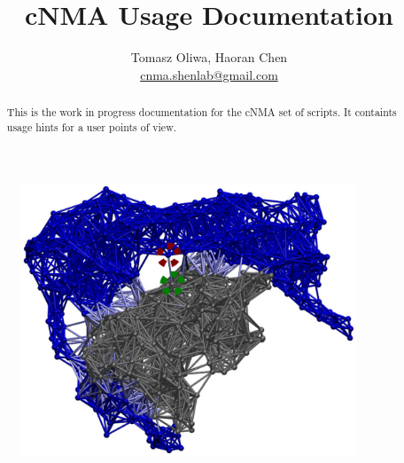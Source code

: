 \documentclass[11pt]{article}
\title{cNMA Usage Documentation}
\begin{document}
\author{Tomasz Oliwa, Haoran Chen\\
		\href{mailto:cnma.shenlab@gmail.com}{cnma.shenlab@gmail.com}}

   \lstset{language=bash,
		   basicstyle=\ttfamily\scriptsize,
		   breaklines=true
		  }
\maketitle




\begin{abstract}
This is the work in progress documentation for the cNMA set of scripts. It containts usage hints for a user points of view.
\end{abstract}

\begin{figure}[h]
\centering
{\includegraphics[width=10cm]{pics/cnma.eps}}
\end{figure}
\newpage
\tableofcontents

\clearpage




\end{document}
